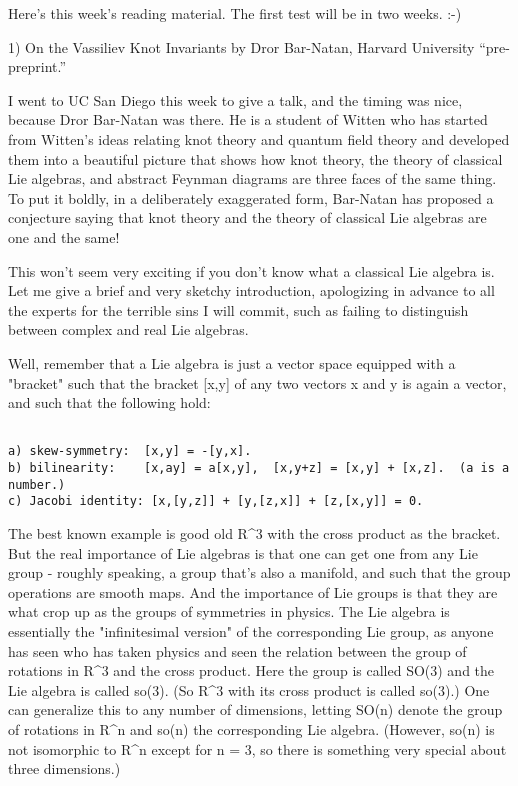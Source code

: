 

Here's this week's reading material.  The first test will be in two
weeks.  :-)

1)  On the Vassiliev Knot Invariants by Dror Bar-Natan, Harvard
University ``pre-preprint.''

I went to UC San Diego this week to give a talk, and the timing was
nice, because Dror Bar-Natan was there.  He is a student of Witten who
has started from Witten's ideas relating knot theory and quantum field
theory and developed them into a beautiful picture that shows how knot
theory, the theory of classical Lie algebras, and abstract Feynman
diagrams are three faces of the same thing.  To put it boldly, in a
deliberately exaggerated form, Bar-Natan has proposed a conjecture
saying that knot theory and the theory of classical Lie algebras are
one and the same!  

This won't seem very exciting if you don't know what a classical Lie
algebra is.  Let me give a brief and very sketchy introduction,
apologizing in advance to all the experts for the terrible sins I will
commit, such as failing to distinguish between complex and real Lie
algebras. 

Well, remember that a Lie algebra is just a vector space
equipped with a "bracket" such that the bracket [x,y] of any two vectors
x and y is again a vector, and such that the following hold:


\begin{verbatim}

a) skew-symmetry:  [x,y] = -[y,x].
b) bilinearity:    [x,ay] = a[x,y],  [x,y+z] = [x,y] + [x,z].  (a is a number.)
c) Jacobi identity: [x,[y,z]] + [y,[z,x]] + [z,[x,y]] = 0.
\end{verbatim}
    

The best known example is good old R^3 with the cross product as the
bracket.  But the real importance of Lie algebras is that one can get
one from any Lie group - roughly speaking, a group that's also a
manifold, and such that the group operations are smooth maps.  And the
importance of Lie groups is that they are what crop up as the groups of
symmetries in physics.  The Lie algebra is essentially the
"infinitesimal version" of the corresponding Lie group, as anyone has
seen who has taken physics and seen the relation between the group of
rotations in R^3 and the cross product.  Here the group is called SO(3)
and the Lie algebra is called so(3).  (So R^3 with its cross product is
called so(3).)  One can generalize this to any number of dimensions,
letting SO(n) denote the group of rotations in R^n and so(n) the
corresponding Lie algebra.  (However, so(n) is not isomorphic to R^n
except for n = 3, so there is something very special about three
dimensions.)  

